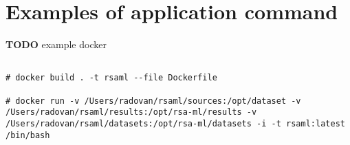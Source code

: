 \chapter{Examples of application command}
\label{appendix-running}

\textbf{TODO} example docker

\begin{verbatim}

# docker build . -t rsaml --file Dockerfile

# docker run -v /Users/radovan/rsaml/sources:/opt/dataset -v /Users/radovan/rsaml/results:/opt/rsa-ml/results -v /Users/radovan/rsaml/datasets:/opt/rsa-ml/datasets -i -t rsaml:latest /bin/bash

\end{verbatim}



